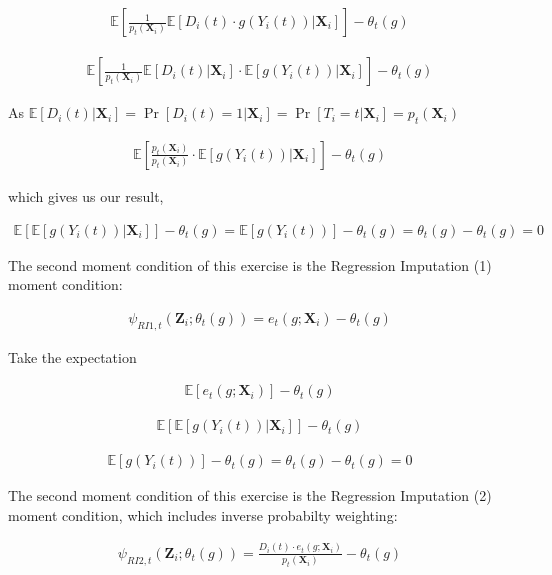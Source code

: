 \documentclass[12pt]{article}
\newcommand{\E}{\mathbb{E}}
\newcommand{\X}{\mathbf{X}}
\begin{document}
\begin{align*}
  \E\left[\frac{1}{p_t(\X_i)}  \E\left[D_i(t) \cdot g(Y_i(t)) |\X_i \right] \right] - \theta_t(g)
\end{align*}

\begin{align*}
  \E\left[\frac{1}{p_t(\X_i)}  \E\left[D_i(t)|\X_i \right] \cdot \E\left[g(Y_i(t)) |\X_i \right] \right] - \theta_t(g)
\end{align*}


As $\E\left[D_i(t)|\X_i \right] = \Pr \left[D_i(t) = 1|\X_i \right] = \Pr \left[T_i= t|\X_i \right] =p_t(\X_i)$

\begin{align*}
  \E\left[\frac{p_t(\X_i)}{p_t(\X_i)} \cdot \E\left[g(Y_i(t)) |\X_i \right] \right] - \theta_t(g)
\end{align*}

which gives us our result,

\begin{align*}
  \E\left[\E\left[g(Y_i(t)) |\X_i \right]\right] - \theta_t(g) = \E\left[g(Y_i(t))\right] - \theta_t(g) = \theta_t(g) -\theta_t(g) = 0
\end{align*}


The second moment condition of this exercise is the Regression Imputation (1) moment condition:

\begin{align*}
\psi_{RI1,t}(\mathbf{Z}_i;\theta_t(g)) =  e_t(g;\X_i)- \theta_t(g)
\end{align*}

Take the expectation

\begin{align*}
\E\left[ e_t(g;\X_i)  \right]  - \theta_t(g)
\end{align*}

\begin{align*}
\E\left[\E\left[ g(Y_i(t)) | \X_i \right]  \right]  - \theta_t(g)
\end{align*}

\begin{align*}
\E\left[g(Y_i(t)) \right] - \theta_t(g) = \theta_t(g) -\theta_t(g) =0
\end{align*}

The second moment condition of this exercise is the Regression Imputation (2) moment condition, which includes inverse probabilty weighting:

\begin{align*}
\psi_{RI2,t}(\mathbf{Z}_i;\theta_t(g)) =  \frac{D_i(t) \cdot e_t(g;\X_i)}{p_t(\X_i)}- \theta_t(g)
\end{align*}
\end{document}

